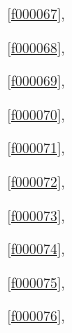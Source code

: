 \noindent\filesourcenumbernameone\ \ref{f000067},\ \pageref{f000067}%

\noindent\filesourcenumbernameone\ \ref{f000068},\ \pageref{f000068}%

\noindent\filesourcenumbernameone\ \ref{f000069},\ \pageref{f000069}%

\noindent\filesourcenumbernameone\ \ref{f000070},\ \pageref{f000070}%

\noindent\filesourcenumbernameone\ \ref{f000071},\ \pageref{f000071}%

\noindent\filesourcenumbernameone\ \ref{f000072},\ \pageref{f000072}%

\noindent\filesourcenumbernameone\ \ref{f000073},\ \pageref{f000073}%

\noindent\filesourcenumbernameone\ \ref{f000074},\ \pageref{f000074}%

\noindent\filesourcenumbernameone\ \ref{f000075},\ \pageref{f000075}%

\noindent\filesourcenumbernameone\ \ref{f000076},\ \pageref{f000076}%









